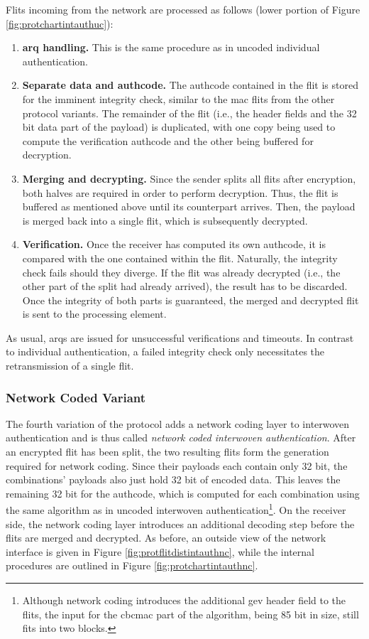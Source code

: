 Flits incoming from the network are processed as follows (lower portion of Figure \ref{fig:protchartintauthuc}):
\begin{enumerate}
    \item \textbf{\Gls{arq} handling.} This is the same procedure as in uncoded individual authentication.
    \item \textbf{Separate data and authcode.} The authcode contained in the flit is stored for the imminent integrity check, similar to the
        \gls{mac} flits from the other protocol variants. The remainder of the flit (i.e., the header fields and the 32 bit data part of the payload)
        is duplicated, with one copy being used to compute the verification authcode and the other being buffered for decryption.
    \item \textbf{Merging and decrypting.} Since the sender splits all flits after encryption, both halves are required in order to perform
        decryption. Thus, the flit is buffered as mentioned above until its counterpart arrives. Then, the payload is merged back into a single flit,
        which is subsequently decrypted.
    \item \textbf{Verification.} Once the receiver has computed its own authcode, it is compared with the one contained within the flit. Naturally,
        the integrity check fails should they diverge. If the flit was already decrypted (i.e., the other part of the split had already arrived), the
        result has to be discarded. Once the integrity of both parts is guaranteed, the merged and decrypted flit is sent to the processing element.
\end{enumerate}
\vspace{0.5\baselineskip}

As usual, \glspl{arq} are issued for unsuccessful verifications and timeouts. In contrast to individual authentication, a failed integrity check only
necessitates the retransmission of a single flit.

\subsubsection{Network Coded Variant}
The fourth variation of the protocol adds a network coding layer to interwoven authentication and is thus called \textit{network coded interwoven
authentication}. After an encrypted flit has been split, the two resulting flits form the generation required for network coding. Since their payloads
each contain only 32 bit, the combinations' payloads also just hold 32 bit of encoded data. This leaves the remaining 32 bit for the authcode, which is
computed for each combination using the same algorithm as in uncoded interwoven authentication\footnote{Although network coding introduces the
additional \gls{gev} header field to the flits, the input for the \gls{cbcmac} part of the algorithm, being 85 bit in size, still fits into two
blocks.}. On the receiver side, the network coding layer introduces an additional decoding step before the flits are merged and decrypted. As before,
an outside view of the network interface is given in Figure \vref{fig:protflitdistintauthnc}, while the internal procedures are outlined in Figure
\vref{fig:protchartintauthnc}.

